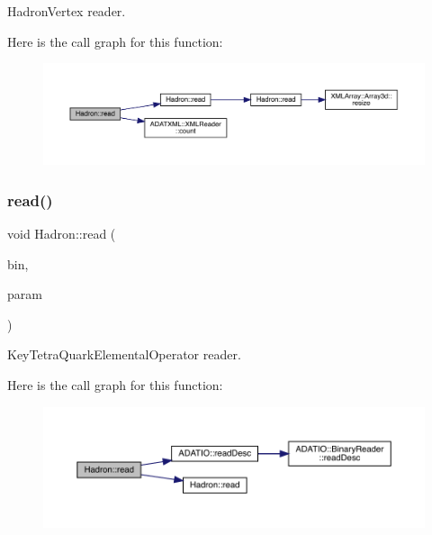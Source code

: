 Hadron\+Vertex reader. 

Here is the call graph for this function\+:
\nopagebreak
\begin{figure}[H]
\begin{center}
\leavevmode
\includegraphics[width=350pt]{d1/daf/namespaceHadron_a83c06845cd19520623de3b0074b9d25c_cgraph}
\end{center}
\end{figure}
\mbox{\label{namespaceHadron_a10d99bb52996f8aec8a87612e98d5684}} 
\subsubsection{\texorpdfstring{read()}{read()}\hspace{0.1cm}{\footnotesize\ttfamily [41/94]}}
{\footnotesize\ttfamily void Hadron\+::read (\begin{DoxyParamCaption}\item[{\mbox{\hyperlink{classADATIO_1_1BinaryReader}{Binary\+Reader}} \&}]{bin,  }\item[{\mbox{\hyperlink{structHadron_1_1KeyTetraQuarkElementalOperator__t}{Key\+Tetra\+Quark\+Elemental\+Operator\+\_\+t}} \&}]{param }\end{DoxyParamCaption})}



Key\+Tetra\+Quark\+Elemental\+Operator reader. 

Here is the call graph for this function\+:
\nopagebreak
\begin{figure}[H]
\begin{center}
\leavevmode
\includegraphics[width=350pt]{d1/daf/namespaceHadron_a10d99bb52996f8aec8a87612e98d5684_cgraph}
\end{center}
\end{figure}
\mbox{\label{namespaceHadron_ae6acb258c409e20fdd2a36b3266138bc}} 
